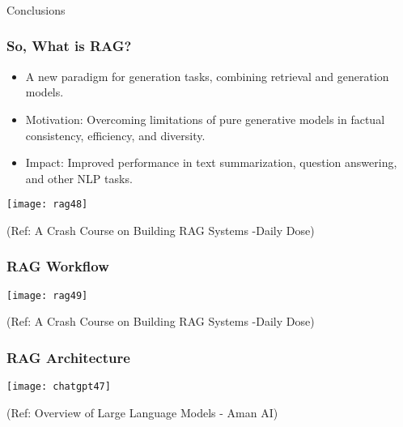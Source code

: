 \begin{frame}[fragile]\frametitle{}
\begin{center}
{\Large Conclusions}
\end{center}
\end{frame}

\begin{frame}[fragile]\frametitle{So, What is RAG?}

\begin{itemize}
\item A new paradigm for generation tasks, combining retrieval and generation models.
\item Motivation: Overcoming limitations of pure generative models in factual consistency, efficiency, and diversity.
\item Impact: Improved performance in text summarization, question answering, and other NLP tasks.
\end{itemize}	



		\begin{center}
		\texttt{[image: rag48]}
		
		
		\end{center}

{\tiny (Ref: A Crash Course on Building RAG Systems -Daily Dose)}


\end{frame}

\begin{frame}[fragile]\frametitle{RAG Workflow}



		\begin{center}
		\texttt{[image: rag49]}
		
		
		\end{center}

{\tiny (Ref: A Crash Course on Building RAG Systems -Daily Dose)}


\end{frame}



\begin{frame}[fragile]\frametitle{RAG Architecture}


		\begin{center}
		\texttt{[image: chatgpt47]}
		\end{center}

{\tiny (Ref: Overview of Large Language Models - Aman AI)}

\end{frame}


